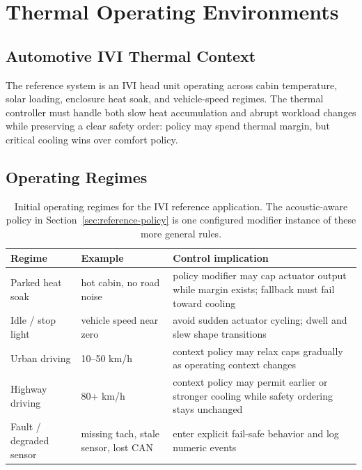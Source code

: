 \section{Thermal Operating Environments}

\subsection{Automotive IVI Thermal Context}

The reference system is an IVI head unit operating across cabin temperature, solar loading, enclosure heat soak, and vehicle-speed regimes. The thermal controller must handle both slow heat accumulation and abrupt workload changes while preserving a clear safety order: policy may spend thermal margin, but critical cooling wins over comfort policy.

\subsection{Operating Regimes}

\begin{table}[h]
\centering
\begin{tabular}{p{}p{}p{}}
\toprule
\textbf{Regime} & \textbf{Example} & \textbf{Control implication} \\
\midrule
Parked heat soak & hot cabin, no road noise & policy modifier may cap actuator output while margin exists; fallback must fail toward cooling \\
Idle / stop light & vehicle speed near zero & avoid sudden actuator cycling; dwell and slew shape transitions \\
Urban driving & 10--50 km/h & context policy may relax caps gradually as operating context changes \\
Highway driving & 80+ km/h & context policy may permit earlier or stronger cooling while safety ordering stays unchanged \\
Fault / degraded sensor & missing tach, stale sensor, lost CAN & enter explicit fail-safe behavior and log numeric events \\
\bottomrule
\end{tabular}
\caption{Initial operating regimes for the IVI reference application. The acoustic-aware policy in Section~\ref{sec:reference-policy} is one configured modifier instance of these more general rules.}
\label{tab:thermal-operating-regimes}
\end{table}

